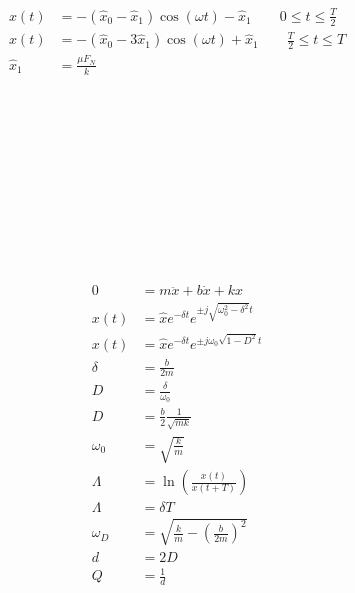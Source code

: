 \begin{boxleft}
\\
\\
\\
\\
\end{boxleft}\begin{boxrightshaded}
\begin{align}
x(t)&=-(\hat{x}_0-\hat{x}_1)\cos(\omega t)-\hat{x}_1\qquad 0\leq t\leq \frac{T}{2}\\
x(t)&=-(\hat{x}_0-3\hat{x}_1)\cos(\omega t)+\hat{x}_1\qquad \frac{T}{2}\leq t\leq T\\
\hat{x}_1&=\frac{\mu F_N}{k}
\end{align}
\end{boxrightshaded}

\begin{boxleft}
\\
\\
\\
\\
\\
\\
\\
\\
\\
\end{boxleft}\begin{boxrightshaded}
\begin{align}
0&=m\ddot{x}+b\dot{x}+kx\\
x(t)&=\hat{x}e^{-\delta t}e^{\pm j\sqrt{\omega_0^2-\delta^2}t}\\
x(t)&=\hat{x}e^{-\delta t}e^{\pm j\omega_0\sqrt{1-D^2}t}\\
\delta&=\frac{b}{2m}\\
D&=\frac{\delta}{\omega_0}\\
D&=\frac{b}{2}\frac{1}{\sqrt{mk}}\\
\omega_0&=\sqrt{\frac{k}{m}}\\
\Lambda&=\ln\left(\frac{x(t)}{x(t+T)}\right)\\
\Lambda&=\delta T\\
\omega_D&=\sqrt{\frac{k}{m}-\left(\frac{b}{2m}\right)^2}\\
d&=2D\\
Q&=\frac{1}{d}
\end{align}
\end{boxrightshaded}

